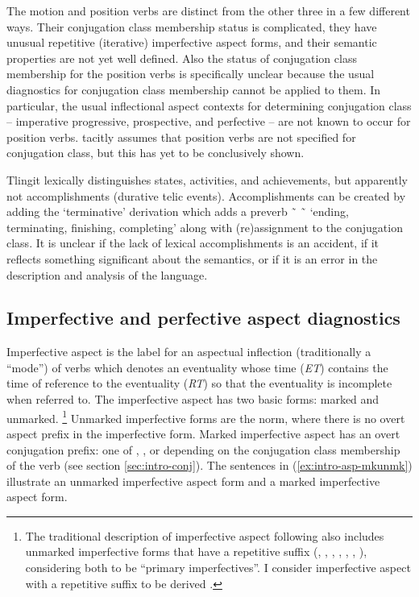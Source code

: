 \documentclass[12pt,letterpaper,oneside,article]{memoir}
\begin{document}
The motion and position verbs are distinct from the other three in a few different ways.
Their conjugation class membership status is complicated, they have unusual repetitive (iterative) imperfective aspect forms, and their semantic properties are not yet well defined.
Also the status of conjugation class membership for the position verbs is specifically unclear because the usual diagnostics for conjugation class membership cannot be applied to them.
In particular, the usual inflectional aspect contexts for determining conjugation class – imperative progressive, prospective, and perfective – are not known to occur for position verbs.
\textcite[71–74, 324–328]{leer:1991} tacitly assumes that position verbs are not specified for conjugation class, but this has yet to be conclusively shown.

Tlingit lexically distinguishes states, activities, and achievements, but apparently not accomplishments (durative telic events).
Accomplishments can be created by adding the ‘terminative’ derivation which adds a 
preverb  \~\  \~\  ‘ending, terminating, finishing, completing’ along with (re)assignment to the  conjugation class.
It is unclear if the lack of lexical accomplishments is an accident, if it reflects something significant about the semantics, or if it is an error in the description and analysis of the language.

\subsection{Imperfective and perfective aspect diagnostics}\label{sec:intro-asp}

Imperfective aspect is the label for an aspectual inflection (traditionally a “mode”) of verbs which denotes an eventuality whose time (\textit{ET}) contains the time of reference to the eventuality (\textit{RT}) so that the eventuality is incomplete when referred to.
The imperfective aspect has two basic forms: marked and unmarked.%
\footnote{The traditional description of imperfective aspect following \textcite{leer:1991} also includes unmarked imperfective forms that have a repetitive suffix (, , , , , , ), considering both to be “primary imperfectives”.
I consider imperfective aspect with a repetitive suffix to be derived \parencite[527]{crippen:2019}.}
Unmarked imperfective forms are the norm, where there is no overt aspect prefix in the imperfective form.
Marked imperfective aspect has an overt conjugation prefix: one of , , or  depending on the conjugation class membership of the verb (see section \ref{sec:intro-conj}).
The sentences in (\ref{ex:intro-asp-mkunmk}) illustrate an unmarked imperfective aspect form and a marked imperfective aspect form.
\end{document}
